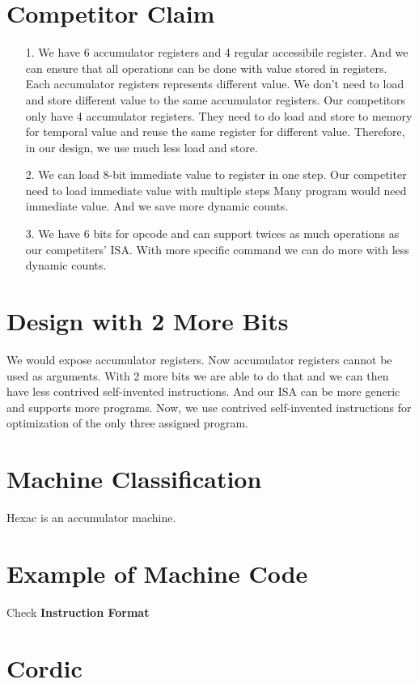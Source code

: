 \documentclass{article}
\begin{document}
  \section{Competitor Claim}
    \begin{itemize}
      \item[1. ] We have 6 accumulator registers and 4 regular accessibile register. And we can ensure that all operations can be done
        with value stored in registers. Each accumulator registers represents different value. We don't need to load and store different
        value to the same accumulator registers. Our competitors only have 4 accumulator registers. They need to do load and store to memory
        for temporal value and reuse the same register for different value. Therefore, in our design, we use much less load and store.
      \item[2. ] We can load 8-bit immediate value to register in one step. Our competiter need to load immediate value with multiple steps
        Many program would need immediate value. And we save more dynamic counts.
      \item[3. ] We have 6 bits for opcode and can support twices as much operations as our competiters' ISA. With more specific command
        we can do more with less dynamic counts.
    \end{itemize}
  \section{Design with 2 More Bits}
    \qquad We would expose accumulator registers. Now accumulator registers cannot be used as arguments. With 2 more bits we are able to do that
    and we can then have less contrived self-invented instructions. And our ISA can be more generic and supports more programs.
    Now, we use contrived self-invented instructions for optimization of the only three assigned program.
  \section{Machine Classification}
    \qquad Hexac is an accumulator machine.
  \section{Example of Machine Code}
    \qquad Check \textbf{Instruction Format}
  \newpage
  \section{Cordic}
\end{document}
